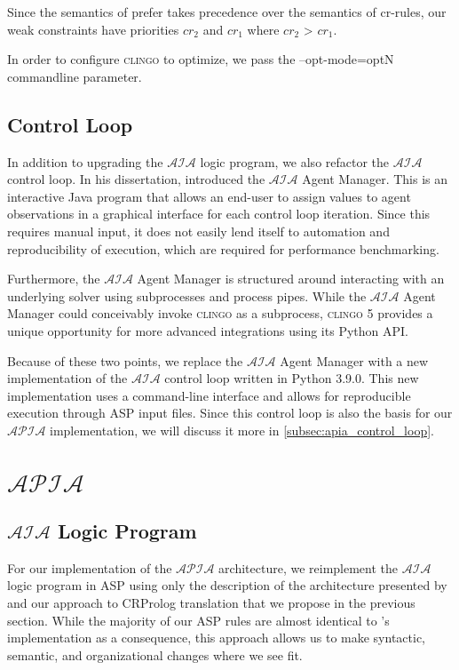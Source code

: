 Since the semantics of prefer takes precedence over the semantics of cr-rules, our weak constraints have priorities $cr_2$ and $cr_1$ where $cr_2$ > $cr_1$.

In order to configure \textsc{clingo} to optimize, we pass the --opt-mode=optN commandline parameter.

\subsection{Control Loop}

In addition to upgrading the $\mathcal{AIA}$ logic program, we also refactor the $\mathcal{AIA}$ control loop.
In his dissertation, \citet{blount_architecture_2013,blount_towards_2014} introduced the $\mathcal{AIA}$ Agent Manager.
This is an interactive Java program that allows an end-user to assign values to agent observations in a graphical interface for each control loop iteration.
Since this requires manual input, it does not easily lend itself to automation and reproducibility of execution, which are required for performance benchmarking.

Furthermore, the $\mathcal{AIA}$ Agent Manager is structured around interacting with an underlying solver using subprocesses and process pipes.
While the $\mathcal{AIA}$ Agent Manager could conceivably invoke \textsc{clingo} as a subprocess, \textsc{clingo} 5 provides a unique opportunity for more advanced integrations using its Python API.

Because of these two points, we replace the $\mathcal{AIA}$ Agent Manager with a new implementation of the $\mathcal{AIA}$ control loop written in Python 3.9.0.
This new implementation uses a command-line interface and allows for reproducible execution through ASP input files.
Since this control loop is also the basis for our $\mathcal{APIA}$ implementation, we will discuss it more in \cref{subsec:apia_control_loop}.

\section{$\mathcal{APIA}$}

\subsection{$\mathcal{AIA}$ Logic Program}

For our implementation of the $\mathcal{APIA}$ architecture, we re­implement the $\mathcal{AIA}$ logic program in ASP using only the description of the architecture presented by \citet{blount_architecture_2013,blount_towards_2014} and our approach to CR­Prolog translation that we propose in the previous section\footnotemark.
While the majority of our ASP rules are almost identical to \citet{blount_architecture_2013,blount_towards_2014}'s implementation as a consequence, this approach allows us to make syntactic, semantic, and organizational changes where we see fit.

